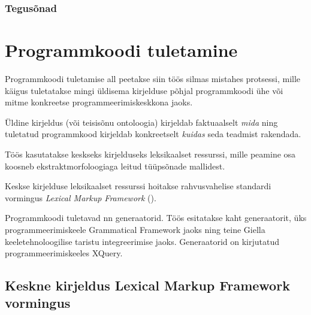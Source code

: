 \documentclass[12pt,a4paper]{article}
\begin{document}
\subsubsection{Tegusõnad}



%
%
%





\newpage
\section{Programmkoodi tuletamine}
\label{sec:programmkoodi-tuletamine}

Programmkoodi tuletamise all peetakse siin töös silmas mistahes protsessi, mille käigus tuletatakse mingi üldisema kirjelduse põhjal programmkoodi ühe või mitme konkreetse programmeerimiskeskkona jaoks.

Üldine kirjeldus (või teisisõnu ontoloogia) kirjeldab faktuaalselt \textit{mida} ning tuletatud programmkood kirjeldab konkreetselt \textit{kuidas} seda teadmist rakendada.

Töös kasutatakse keskseks kirjelduseks leksikaalset ressurssi, mille peamine osa koosneb ekstraktmorfoloogiaga leitud tüüpsõnade mallidest.

Keskse kirjelduse leksikaalset ressurssi hoitakse rahvusvahelise standardi vormingus \textit{Lexical Markup Framework} (\cite{iso/tc_37/sc_4_language_2007}).

Programmkoodi tuletavad nn generaatorid. Töös esitatakse kaht generaatorit, üks programmeerimiskeele Grammatical Framework jaoks ning teine Giella keeletehnoloogilise taristu integreerimise jaoks. Generaatorid on kirjutatud programmeerimiskeeles XQuery.




\subsection{Keskne kirjeldus Lexical Markup Framework vormingus}
\end{document}
